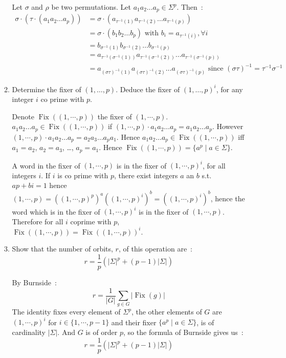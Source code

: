 \documentclass[a4paper,11pt]{exam}
\DeclareMathOperator{\Fix}{Fix}
\begin{document}
\begin{questions}
\begin{enumerate}
\begin{enumerate}
		\begin{solution}
			Let $\sigma$ and $\rho$ be two permutations.
			Let $a_1 a_2 \dots a_p \in \Sigma^p$. 
			Then~:
			\pagebreak
			\begin{align*}
			\sigma \cdot (\tau \cdot (a_1 a_2 \dots a_p))
			&= \sigma \cdot (a_{\tau^{-1}(1)}a_{\tau^{-1}(2)}
			\dots a_{\tau^{-1}(p)}) \\
			&= \sigma \cdot (b_1 b_2 \dots b_p)
			\text{ with } b_i=a_{\tau^{-1}(i)}, \forall i \\
			&= b_{\sigma^{-1}(1)} b_{\sigma^{-1}(2)}
			\dots b_{\sigma^{-1}(p)} \\
			&=  a_{\tau^{-1}(\sigma^{-1}(1))} a_{\tau^{-1}(\sigma^{-1}(2))}
			\dots a_{\tau^{-1}(\sigma^{-1}(p))} \\
			&= a_{(\sigma\tau)^{-1}(1)} a_{(\sigma\tau)^{-1}(2)}
			\dots a_{(\sigma\tau)^{-1}(p)}
			\text{ since } (\sigma\tau)^{-1} = \tau^{-1}\sigma^{-1}
			\end{align*}
		\end{solution}
		
		\item Determine the fixer of $(1,\dots,p)$. Deduce the fixer of $ (1, \dots, p)^i $, for any integer $ i $ co prime with $ p $.
		
		\begin{solution}
			Denote $\Fix((1,\cdots,p))$ the fixer  of $(1,\cdots,p)$.
			$a_1 a_2 \dots a_p \in \Fix((1,\cdots,p))$  if
			$(1,\cdots,p) \cdot a_1 a_2 \dots a_p = a_1 a_2 \dots a_p$.
			However $(1,\cdots,p) \cdot a_1 a_2 \dots a_p = a_2 a_3 \dots a_p a_1$.
			Hence $a_1 a_2 \dots a_p \in \Fix((1,\cdots,p))$ iff $a_1=a_2$, $a_2=a_3$, \dots, $a_p=a_1$.
			Hence $\Fix((1,\cdots,p)) = \{ a^p \mid a \in \Sigma \}$.
			
			A word in the fixer of $(1,\cdots,p)$ is in the fixer of $(1,\cdots,p)^i$, for all integers $i$.
			If $i$ is co prime with $p$, there exist  integers $a$ an $b$ s.t. $ap+bi=1$ hence $(1,\cdots,p)=((1,\cdots,p)^p)^a((1,\cdots,p)^i)^b=((1,\cdots,p)^i)^b$, hence the word which is in the fixer of $(1,\cdots,p)^i$ is in the fixer of $(1,\cdots,p)$.
			Therefore for all $i$ coprime with $p$, $\Fix((1,\cdots,p))=\Fix((1,\cdots,p))^i$.
		\end{solution}
		
		\item Show that the number of orbits, $r$, of this operation are~:
		\[
		r = \frac{1}{p} (|\Sigma|^p + (p-1) |\Sigma|)
		\]
		
		\begin{solution}
			By Burnside~:
			\[
			r = \frac{1}{|G|}\sum_{g \in G}|\Fix(g)|
			\]
			The identity fixes every element of  $\Sigma^p$, the other elements of $G$ are $(1,\cdots,p)^i$ for $i \in \{1,\cdots,p-1 \}$ and their fixer $\{ a^p \mid a \in \Sigma \}$, is of cardinality $|\Sigma|$.
			And $G$ is of order $p$, so the formula of Burnside gives us~:
			\[
			r = \frac{1}{p}(|\Sigma|^p+(p-1)|\Sigma|)
			\]
		\end{solution}
		

\end{enumerate}
\end{enumerate}
\end{questions}
\end{document}
